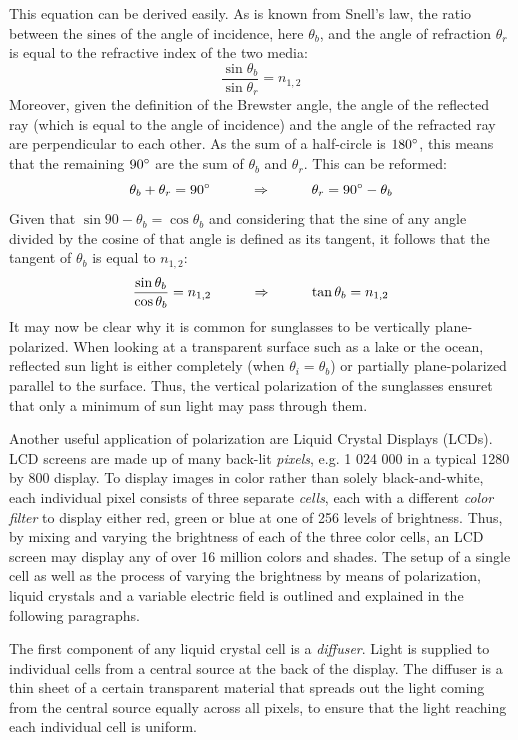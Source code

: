 This equation can be derived easily. As is known from Snell's law, the ratio between the sines of the angle of incidence, here $\theta_b$, and the angle of refraction $\theta_r$ is equal to the refractive index of the two media: $$\frac{\sin \theta_b}{\sin \theta_r} = n_{1, 2}$$ Moreover, given the definition of the Brewster angle, the angle of the reflected ray (which is equal to the angle of incidence) and the angle of the refracted ray are perpendicular to each other. As the sum of a half-circle is $180\degree$, this means that the remaining $90\degree$ are the sum of $\theta_b$ and $\theta_r$. This can be reformed: $$\theta_b + \theta_r = 90\degree \hspace{1 cm} \Rightarrow \hspace{1 cm} \theta_r = 90\degree - \theta_b$$ Given that $\sin 90 - \theta_b = \cos \theta_b$ and considering that the sine of any angle divided by the cosine of that angle is defined as its tangent, it follows that the tangent of $\theta_b$ is equal to $n_{1, 2}$: $$\frac{\sin \theta_b}{\cos \theta_b} = n_{1, 2} \hspace{1 cm} \Rightarrow \hspace{1 cm} \tan \theta_b = n_{1, 2}$$ It may now be clear why it is common for sunglasses to be vertically plane-polarized. When looking at a transparent surface such as a lake or the ocean, reflected sun light is either completely (when $\theta_i = \theta_b$) or partially plane-polarized parallel to the surface. Thus, the vertical polarization of the sunglasses ensuret that only a minimum of sun light may pass through them.


Another useful application of polarization are Liquid Crystal Displays (LCDs). LCD screens are made up of many back-lit \emph{pixels}, e.g. 1 024 000 in a typical 1280 by 800 display. To display images in color rather than solely black-and-white, each individual pixel consists of three separate \emph{cells}, each with a different \emph{color filter} to display either red, green or blue at one of 256 levels of brightness. Thus, by mixing and varying the brightness of each of the three color cells, an LCD screen may display any of over 16 million colors and shades. The setup of a single cell as well as the process of varying the brightness by means of polarization, liquid crystals and a variable electric field is outlined and explained in the following paragraphs.

The first component of any liquid crystal cell is a \emph{diffuser}. Light is supplied to individual cells from a central source at the back of the display. The diffuser is a thin sheet of a certain transparent material that spreads out the light coming from the central source equally across all pixels, to ensure that the light reaching each individual cell is uniform.

